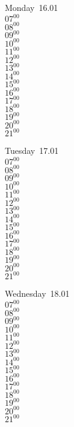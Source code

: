 \documentclass[11pt,a4paper]{book}\usepackage[]{graphicx}\usepackage[]{color}
\begin{document}
\begin{headerbox}
\end{headerbox}
\begin{weekdaybox}
  Monday~16.01\\
  { 
  \vfill
  $07^{00}$\\
$08^{00}$\\
$09^{00}$\\
$10^{00}$\\
$11^{00}$\\
$12^{00}$\\
$13^{00}$\\
$14^{00}$\\
$15^{00}$\\
$16^{00}$\\
$17^{00}$\\
$18^{00}$\\
$19^{00}$\\
$20^{00}$\\
$21^{00}$\\
  }
\end{weekdaybox}
\begin{weekdaybox}
  Tuesday~17.01\\
  { 
  \vfill
  $07^{00}$\\
$08^{00}$\\
$09^{00}$\\
$10^{00}$\\
$11^{00}$\\
$12^{00}$\\
$13^{00}$\\
$14^{00}$\\
$15^{00}$\\
$16^{00}$\\
$17^{00}$\\
$18^{00}$\\
$19^{00}$\\
$20^{00}$\\
$21^{00}$\\
  }
\end{weekdaybox}
\begin{weekdaybox}
  Wednesday~18.01\\
  { 
  \vfill
  $07^{00}$\\
$08^{00}$\\
$09^{00}$\\
$10^{00}$\\
$11^{00}$\\
$12^{00}$\\
$13^{00}$\\
$14^{00}$\\
$15^{00}$\\
$16^{00}$\\
$17^{00}$\\
$18^{00}$\\
$19^{00}$\\
$20^{00}$\\
$21^{00}$\\
  }
\end{weekdaybox}
\end{document}

